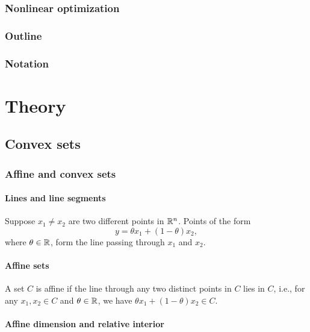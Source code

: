 \documentclass[11pt,oneside,a4paper]{book}
\theoremstyle{definition}
\DeclareRobustCommand{\[}{\begin{equation}}
\DeclareRobustCommand{\]}{\end{equation}}
\begin{document}
\section{Nonlinear optimization}

\section{Outline}

\section{Notation}

\part{Theory}

\chapter{Convex sets}  

\section{Affine and convex sets}

\subsection{Lines and line segments}

Suppose $ x_1\neq x_2 $ are two different points in $ \mathbb{R}^n $. Points of the form
\begin{equation*}
y=\theta x_1+(1-\theta) x_2,
\end{equation*}
where $ \theta\in\mathbb{R} $, form the line passing through $ x_1 $ and $ x_2 $.

\subsection{Affine sets}

A set $ C $ is affine if the line through any two distinct points in $ C $ lies in $ C $, i.e., for any $ x_1,x_2\in C $ and $ \theta\in\mathbb{R} $, we have $ \theta x_1+(1-\theta)x_2\in C $.

\subsection{Affine dimension and relative interior}
\end{document}
